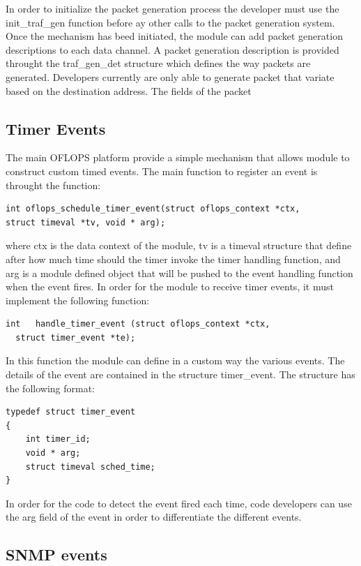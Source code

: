 \documentclass{book}
\begin{document}
In order to initialize the packet generation process the developer must use the init\_traf\_gen function
before ay other calls to the packet generation system. Once the mechanism has beed initiated, the module 
can add packet generation descriptions to each data channel. A packet generation description is provided 
throught the traf\_gen\_det structure which defines the way packets are generated. Developers currently 
are only able to generate packet that variate based on the destination address. The fields of the packet

\subsection{Timer Events}

The main OFLOPS platform provide a simple mechanism that allows module to construct custom timed events.
The main function to register an event is throught the function:

\begin{lstlisting}
int oflops_schedule_timer_event(struct oflops_context *ctx, 
struct timeval *tv, void * arg);
\end{lstlisting}
where ctx is the data context of the module, tv is a timeval structure that define after how much
time should the timer invoke the timer handling function, and arg is a module defined object that will
be pushed to the event handling function when the event fires. In order for the module to receive timer 
events, it must implement the following function:
\begin{lstlisting}
int   handle_timer_event (struct oflops_context *ctx, 
  struct timer_event *te);
\end{lstlisting}

In this function the module can define in a custom way the various events. The details of the event 
are contained in the structure timer\_event. The structure has the following format:

\begin{lstlisting}
typedef struct timer_event
{
	int timer_id;            
	void * arg;
	struct timeval sched_time;
} 
\end{lstlisting}

In order for the code to detect the event fired each time, code developers can use the arg field of the 
event in order to differentiate the different events.

\subsection{SNMP events}
\end{document}
